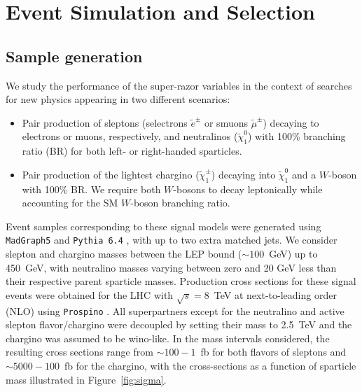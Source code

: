 \clearpage

\section{Event Simulation and Selection \label{sec:simulation}}

\subsection{Sample generation}

We study the performance of the super-razor variables in the context of searches for new physics appearing in two different scenarios:
\begin{itemize}
\item Pair production of sleptons (selectrons $\tilde{e}^\pm$ or smuons $\tilde{\mu}^\pm$) decaying to electrons or muons, respectively, and neutralinos ($\tilde{\chi}_1^0$) with 100\% branching ratio (BR) for both left- or right-handed sparticles.
\item Pair production of the lightest chargino ($\tilde{\chi}_1^\pm$) decaying into $\tilde{\chi}_1^0$ and a $W$-boson with 100\% BR. We require both $W$-bosons to decay leptonically while accounting for the SM $W$-boson branching ratio.
\end{itemize}
Event samples corresponding to these signal models were generated using {\tt MadGraph5} \cite{Alwall:2011uj} and {\tt Pythia 6.4} \cite{Sjostrand:2006za}, with up to two extra matched jets. 
We consider slepton and chargino masses between the LEP bound ($\sim 100$~GeV) up to 450~GeV, with neutralino masses varying between zero and 20 GeV less than their respective parent sparticle masses. Production cross sections for these signal events were obtained for the LHC with $\sqrt{s} = 8$~TeV at next-to-leading order (NLO) using {\tt Prospino} \cite{Beenakker:1999xh}. All superpartners except for the neutralino and active slepton flavor/chargino were decoupled by setting their mass to 2.5~TeV and the chargino was assumed to be wino-like. In the mass intervals considered, the resulting cross sections range from $\sim 100 - 1$~fb for both flavors of sleptons and $\sim 5000-100$~fb for the chargino, with the cross-sections as a function of sparticle mass illustrated in Figure~\ref{fig:sigma}. 
